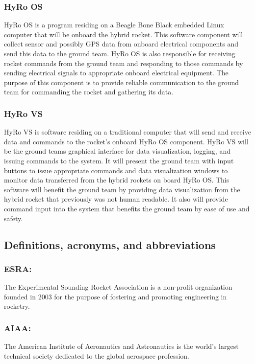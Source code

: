 \documentclass[10pt,draftclsnofoot,onecolumn,compsoc]{IEEEtran}
\begin{document}
\subsubsection{HyRo OS}
HyRo OS is a program residing on a Beagle Bone Black embedded Linux computer that will be onboard the hybrid rocket. This software component will collect sensor and possibly
 GPS data from onboard electrical components and send this data to the ground team. HyRo OS is also responsible for receiving rocket commands from the ground team and responding to those
 commands by sending electrical signals to appropriate onboard electrical equipment. The purpose of this component is to provide reliable communication to the ground team for commanding
the rocket and gathering its data. 
\subsubsection{HyRo VS}
HyRo VS is software residing on a traditional computer that will send and receive data and commands to the rocket's onboard HyRo OS component. HyRo VS will be the ground teams graphical interface for data visualization, logging, and issuing commands to the system. It will present the ground team with input buttons to issue appropriate commands and data visualization windows to monitor data transferred from the hybrid rockets on board HyRo OS. This software will benefit the ground team by providing data visualization from the hybrid rocket that previously was not human readable. It also will provide command input into the system that benefits the ground team by ease of use and safety.

\subsection{Definitions, acronyms, and abbreviations}
\subsubsection{\bf ESRA:}  The Experimental Sounding Rocket Association is a non-profit organization founded in 2003 for the purpose of fostering and promoting engineering in rocketry.
\subsubsection{\bf AIAA:} The American Institute of Aeronautics and Astronautics is the world's largest technical society dedicated to the global aerospace profession.
\end{document}
